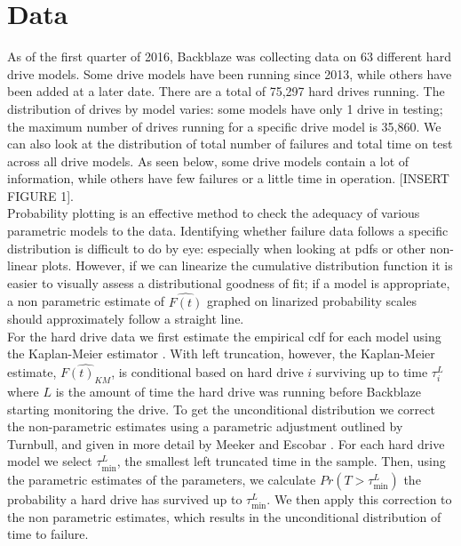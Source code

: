\documentclass[12pt]{article}
\begin{document}
\section{Data}
As of the first quarter of 2016, Backblaze was collecting data on 63 different hard drive models.  Some drive models have been running since 2013, while others have been added at a later date.  There are a total of 75,297 hard drives running.  The distribution of drives by model varies: some models have only 1 drive in testing; the maximum number of drives running for a specific drive model is 35,860.  We can also look at the distribution of total number of failures and total time on test across all drive models.  As seen below, some drive models contain a lot of information, while others have few failures or a little time in operation. [INSERT FIGURE 1]. \\

Probability plotting is an effective method to check the adequacy of various parametric models to the data.  Identifying whether failure data follows a specific distribution is difficult to do by eye: especially when looking at pdfs or other non-linear plots.  However, if we can linearize the cumulative distribution function it is easier to visually assess a distributional goodness of fit; if a model is appropriate, a non parametric estimate of $\hat{F(t)}$ graphed on linarized probability scales should approximately follow a straight line. \\

For the hard drive data we first estimate the empirical cdf for each model using the Kaplan-Meier estimator \cite{kaplan}.  With left truncation, however, the Kaplan-Meier estimate, $\widehat{F(t)_{KM}}$, is conditional based on hard drive $i$ surviving up to time $\tau_i^L$ where $L$ is the amount of time the hard drive was running before Backblaze starting monitoring the drive.  To get the unconditional distribution we correct the non-parametric estimates using a parametric adjustment outlined by Turnbull, and given in more detail by Meeker and Escobar \cite{turnbull,meeker}.  For each hard drive model we select $\tau_{\text{min}}^L$, the smallest left truncated time in the sample.  Then, using the parametric estimates of the parameters, we calculate $Pr(T>\tau_\text{min}^L)$ the probability a hard drive has survived up to $\tau_{\text{min}}^L$.  We then apply this correction to the non parametric estimates, which results in the unconditional distribution of time to failure.\\
\end{document}

